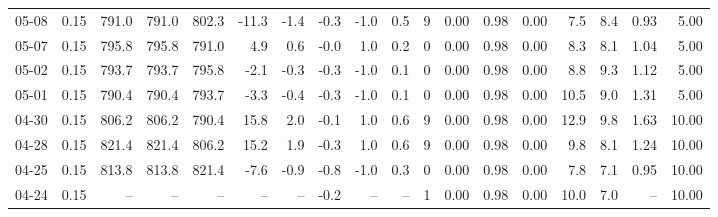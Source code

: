\begin{threeparttable}
{\begin{tabular}{lrrrrrrrrrrrrrrrrr}
  05-08 &     0.15 & 791.0 & 791.0 & 802.3 &      -11.3 &           -1.4 &                      -0.3 &                     -1.0 &                 0.5 &              9 &       0.00 &      0.98 &           0.00 &              7.5 &                 8.4 &            0.93 &                   5.00 \\
  05-07 &     0.15 & 795.8 & 795.8 & 791.0 &        4.9 &            0.6 &                      -0.0 &                      1.0 &                 0.2 &              0 &       0.00 &      0.98 &           0.00 &              8.3 &                 8.1 &            1.04 &                   5.00 \\
  05-02 &     0.15 & 793.7 & 793.7 & 795.8 &       -2.1 &           -0.3 &                      -0.3 &                     -1.0 &                 0.1 &              0 &       0.00 &      0.98 &           0.00 &              8.8 &                 9.3 &            1.12 &                   5.00 \\
  05-01 &     0.15 & 790.4 & 790.4 & 793.7 &       -3.3 &           -0.4 &                      -0.3 &                     -1.0 &                 0.1 &              0 &       0.00 &      0.98 &           0.00 &             10.5 &                 9.0 &            1.31 &                   5.00 \\
  04-30 &     0.15 & 806.2 & 806.2 & 790.4 &       15.8 &            2.0 &                      -0.1 &                      1.0 &                 0.6 &              9 &       0.00 &      0.98 &           0.00 &             12.9 &                 9.8 &            1.63 &                  10.00 \\
  04-28 &     0.15 & 821.4 & 821.4 & 806.2 &       15.2 &            1.9 &                      -0.3 &                      1.0 &                 0.6 &              9 &       0.00 &      0.98 &           0.00 &              9.8 &                 8.1 &            1.24 &                  10.00 \\
  04-25 &     0.15 & 813.8 & 813.8 & 821.4 &       -7.6 &           -0.9 &                      -0.8 &                     -1.0 &                 0.3 &              0 &       0.00 &      0.98 &           0.00 &              7.8 &                 7.1 &            0.95 &                  10.00 \\
  04-24 &     0.15 &    -- &    -- &    -- &         -- &             -- &                      -0.2 &                       -- &                  -- &              1 &       0.00 &      0.98 &           0.00 &             10.0 &                 7.0 &              -- &                  10.00 \\

\end{tabular}}
\end{threeparttable}
